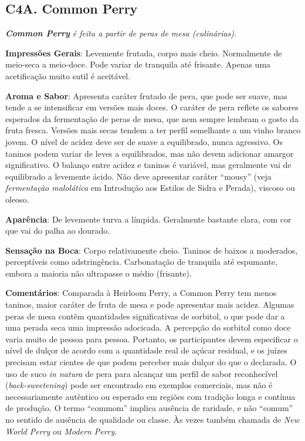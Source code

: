 \subsection*{C4A. Common Perry}

\textit{\textbf{Common Perry} é feita a partir de peras de mesa (culinárias).}

\textbf{Impressões Gerais}: Levemente frutada, corpo mais cheio. Normalmente de meio-seca a meio-doce. Pode variar de tranquila até frisante. Apenas uma acetificação muito sutil é aceitável.

\textbf{Aroma e Sabor}: Apresenta caráter frutado de pera, que pode ser suave, mas tende a se intensificar em versões mais doces. O caráter de pera reflete os sabores esperados da fermentação de peras de mesa, que nem sempre lembram o gosto da fruta fresca. Versões mais secas tendem a ter perfil semelhante a um vinho branco jovem. O nível de acidez deve ser de suave a equilibrado, nunca agressivo. Os taninos podem variar de leves a equilibrados, mas não devem adicionar amargor significativo. O balanço entre acidez e taninos é variável, mas geralmente vai de equilibrado a levemente ácido. Não deve apresentar caráter “mousy” (veja \textit{fermentação malolática} em Introdução aos Estilos de Sidra e Perada), viscoso ou oleoso.

\textbf{Aparência}: De levemente turva a límpida. Geralmente bastante clara, com cor que vai do palha ao dourado.

\textbf{Sensação na Boca}: Corpo relativamente cheio. Taninos de baixos a moderados, perceptíveis como adstringência. Carbonatação de tranquila até espumante, embora a maioria não ultrapasse o médio (frisante).

\textbf{Comentários}: Comparada à Heirloom Perry, a Common Perry tem menos taninos, maior caráter de fruta de mesa e pode apresentar mais acidez. Algumas peras de mesa contêm quantidades significativas de sorbitol, o que pode dar a uma perada seca uma impressão adocicada. A percepção do sorbitol como doce varia muito de pessoa para pessoa. Portanto, os participantes devem especificar o nível de dulçor de acordo com a quantidade real de açúcar residual, e os juízes precisam estar cientes de que podem perceber mais dulçor do que o declarada. O uso de suco \textit{in natura} de pera para alcançar um perfil de sabor reconhecível (\textit{back-sweetening}) pode ser encontrado em exemplos comerciais, mas não é necessariamente autêntico ou esperado em regiões com tradição longa e contínua de produção. O termo “commom” implica ausência de raridade, e não “comum” no sentido de ausência de qualidade ou classe. Às vezes também chamada de \textit{New World Perry} ou \textit{Modern Perry}.

